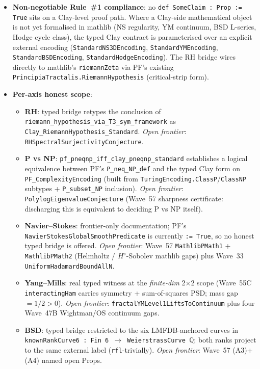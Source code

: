 \begin{itemize}
\begin{itemize}
  \item Chapter~4: \texttt{PF/Consciousness/TimelessFieldConcreteMorphism.lean} discharges all four open Ch~4 Props at the skeleton level plus the consciousness-crystallization witness.
  \end{itemize}
\item \textbf{Non-negotiable Rule~\#1 compliance}: no \texttt{def SomeClaim : Prop := True} sits on a Clay-level proof path. Where a Clay-side mathematical object is not yet formalised in mathlib (NS regularity, YM continuum, BSD L-series, Hodge cycle class), the typed Clay contract is parameterised over an explicit external encoding (\texttt{StandardNS3DEncoding}, \texttt{StandardYMEncoding}, \texttt{StandardBSDEncoding}, \texttt{StandardHodgeEncoding}). The RH bridge wires directly to mathlib's \texttt{riemannZeta} via PF's existing \texttt{PrincipiaTractalis.RiemannHypothesis} (critical-strip form).
\item \textbf{Per-axis honest scope}:
  \begin{itemize}
  \item \textbf{RH}: typed bridge retypes the conclusion of \texttt{riemann\_hypothesis\_via\_T3\_sym\_framework} as \texttt{Clay\_RiemannHypothesis\_Standard}. \emph{Open frontier}: \texttt{RHSpectralSurjectivityConjecture}.
  \item \textbf{P vs NP}: \texttt{pf\_pneqnp\_iff\_clay\_pneqnp\_standard} establishes a logical equivalence between PF's \texttt{P\_neq\_NP\_def} and the typed Clay form on \texttt{PF\_ComplexityEncoding} (built from \texttt{TuringEncoding.ClassP}/\texttt{ClassNP} subtypes + \texttt{P\_subset\_NP} inclusion). \emph{Open frontier}: \texttt{PolylogEigenvalueConjecture} (Wave~57 sharpness certificate: discharging this is equivalent to deciding P vs NP itself).
  \item \textbf{Navier--Stokes}: frontier-only documentation; PF's \texttt{NavierStokesGlobalSmoothPredicate} is currently \texttt{:= True}, so no honest typed bridge is offered. \emph{Open frontier}: Wave~57 \texttt{MathlibPMath1} + \texttt{MathlibPMath2} (Helmholtz / $H^s$-Sobolev mathlib gaps) plus Wave~33 \texttt{UniformHadamardBoundAllN}.
  \item \textbf{Yang--Mills}: real typed witness at the \emph{finite-dim} 2$\times$2 scope (Wave~55C \texttt{interactingHam} carries symmetry + sum-of-squares PSD; mass gap $= 1/2 > 0$). \emph{Open frontier}: \texttt{fractalYMLevel1LiftsToContinuum} plus four Wave~47B Wightman/OS continuum gaps.
  \item \textbf{BSD}: typed bridge restricted to the six LMFDB-anchored curves in \texttt{knownRankCurve6 : Fin 6 $\to$ WeierstrassCurve $\mathbb{Q}$}; both ranks project to the same external label (\texttt{rfl}-trivially). \emph{Open frontier}: Wave~57 (A3)+(A4) named open Props.

\end{itemize}
\end{itemize}
